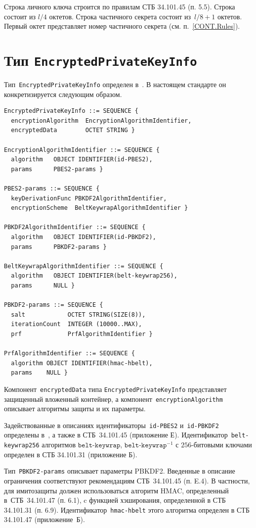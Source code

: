 Строка личного ключа строится по правилам СТБ 34.101.45 (п. 5.5). 
Строка состоит из $l/4$ октетов. 
%
Строка частичного секрета состоит из~$l/8+1$ октетов. 
Первый октет представляет номер частичного секрета (см. п.~\ref{CONT.Rules}).

\section{Тип \texttt{EncryptedPrivateKeyInfo}}\label{CONT.CT}

Тип~\texttt{EncryptedPrivateKeyInfo} определен в~\cite{PKCS5}. В настоящем
стандарте он конкретизируется следующим образом.

\begin{verbatim}
EncryptedPrivateKeyInfo ::= SEQUENCE {
  encryptionAlgorithm  EncryptionAlgorithmIdentifier,
  encryptedData        OCTET STRING }

EncryptionAlgorithmIdentifier ::= SEQUENCE {
  algorithm   OBJECT IDENTIFIER(id-PBES2),
  params      PBES2-params }

PBES2-params ::= SEQUENCE {
  keyDerivationFunc PBKDF2AlgorithmIdentifier,
  encryptionScheme  BeltKeywrapAlgorithmIdentifier }

PBKDF2AlgorithmIdentifier ::= SEQUENCE {
  algorithm   OBJECT IDENTIFIER(id-PBKDF2),
  params      PBKDF2-params }

BeltKeywrapAlgorithmIdentifier ::= SEQUENCE {
  algorithm   OBJECT IDENTIFIER(belt-keywrap256),
  params      NULL }

PBKDF2-params ::= SEQUENCE {
  salt            OCTET STRING(SIZE(8)),
  iterationCount  INTEGER (10000..MAX),
  prf             PrfAlgorithmIdentifier }

PrfAlgorithmIdentifier ::= SEQUENCE {
  algorithm OBJECT IDENTIFIER(hmac-hbelt), 
  params    NULL }

\end{verbatim}

Компонент~\texttt{encryptedData} типа \texttt{EncryptedPrivateKeyInfo}
представляет защищенный вложенный контейнер, 
а компонент~\texttt{encryptionAlgorithm} описывает
алгоритмы защиты и их параметры. 

Задействованные в описаниях идентификаторы~\texttt{id-PBES2} 
и~\texttt{id-PBKDF2} определены в~\cite{PKCS5}, а также в СТБ~34.101.45 
(приложение Е).  
%
Идентификатор~\texttt{belt-keywrap256} алгоритмов 
$\texttt{belt-keywrap}$, $\texttt{belt-keywrap}^{-1}$
с $256$-битовыми ключами определен в СТБ 34.101.31 (приложение Б).

Тип~\texttt{PBKDF2-params} описывает параметры PBKDF2.
Введенные в описание ограничения соответствуют 
рекомендациям СТБ~34.101.45 (п. E.4).
%
В частности, для имитозащиты должен использоваться алгоритм HMAC, 
определенный в~СТБ~34.101.47 (п. 6.1), c функцией хэширования, 
определенной в СТБ 34.101.31 (п. 6.9). 
Идентификатор~\texttt{hmac-hbelt} этого алгоритма 
определен в СТБ 34.101.47 (приложение~Б).

